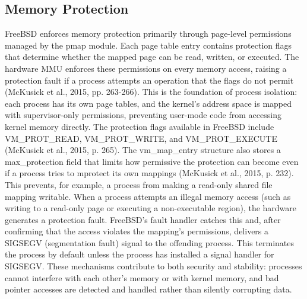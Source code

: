 \subsection{Memory Protection}
FreeBSD enforces memory protection primarily through page-level permissions managed by the pmap module. Each page table entry contains protection flags that determine whether the mapped page can be read, written, or executed. The hardware MMU enforces these permissions on every memory access, raising a protection fault if a process attempts an operation that the flags do not permit (McKusick et al., 2015, pp. 263-266). This is the foundation of process isolation: each process has its own page tables, and the kernel's address space is mapped with supervisor-only permissions, preventing user-mode code from accessing kernel memory directly.
The protection flags available in FreeBSD include VM\_PROT\_READ, VM\_PROT\_WRITE, and VM\_PROT\_EXECUTE (McKusick et al., 2015, p. 265). The vm\_map\_entry structure also stores a max\_protection field that limits how permissive the protection can become even if a process tries to mprotect its own mappings (McKusick et al., 2015, p. 232). This prevents, for example, a process from making a read-only shared file mapping writable.
When a process attempts an illegal memory access (such as writing to a read-only page or executing a non-executable region), the hardware generates a protection fault. FreeBSD's fault handler catches this and, after confirming that the access violates the mapping's permissions, delivers a SIGSEGV (segmentation fault) signal to the offending process. This terminates the process by default unless the process has installed a signal handler for SIGSEGV. These mechanisms contribute to both security and stability: processes cannot interfere with each other's memory or with kernel memory, and bad pointer accesses are detected and handled rather than silently corrupting data.

